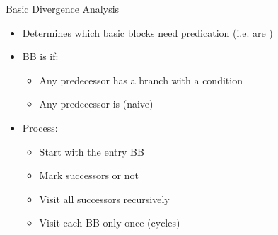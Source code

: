 
\begin{frame}{Basic Divergence Analysis}

\begin{minipage}[t]{0.50\linewidth}

\begin{itemize}
    \item Determines which basic blocks need predication (i.e. are )
    \item BB is  if:
    \begin{itemize}
        \item Any predecessor has a branch with a  condition
        \item Any predecessor is  (naive)
    \end{itemize}
    \item Process:
    \begin{itemize}
        \item Start with the entry BB
        \item Mark successors  or not
        \item Visit all successors recursively
        \item Visit each BB only once (cycles)
    \end{itemize}
\end{itemize}

\end{minipage}
\hspace{1em}
\begin{minipage}[t]{0.43\linewidth}


\end{minipage}
\end{frame}
